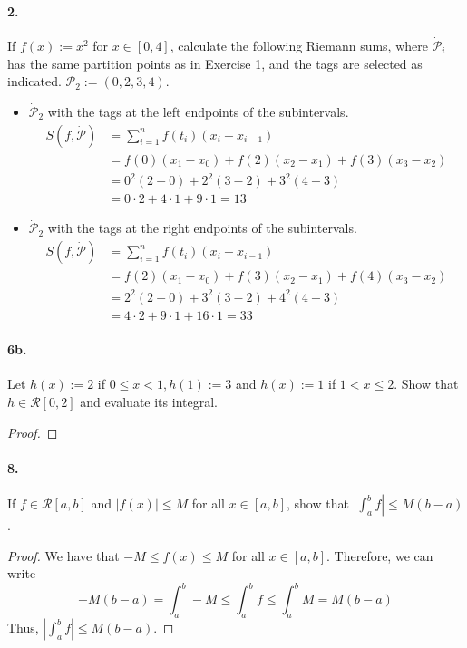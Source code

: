 \documentclass[12pt]{article}
\theoremstyle{remark}
\begin{document}
\paragraph{2.} If $f(x):=x^2$ for $x \in[0,4]$, calculate the following Riemann sums, where $\dot{\mathcal{P}}_i$ has the same partition points as in Exercise 1, and the tags are selected as indicated. $\mathcal{P}_2 := (0, 2, 3, 4)$.
\begin{itemize}
    \item $\dot{\mathcal{P}}_2$ with the tags at the left endpoints of the subintervals.
    \begin{align*} 
        S(f, \dot{\mathcal{P}}) &=\sum_{i=1}^n f\left(t_i\right)\left(x_i-x_{i-1}\right) \\
        &=f(0)\left(x_1-x_0\right)+f(2)\left(x_2-x_1\right)+f(3)\left(x_3-x_2\right) \\
        &=0^2(2-0)+2^2(3-2)+3^2(4-3) \\
        &=0 \cdot 2+4 \cdot 1+9 \cdot 1=13 
    \end{align*}
    \item $\dot{\mathcal{P}}_2$ with the tags at the right endpoints of the subintervals.
    \begin{align*}
        S(f, \dot{\mathcal{P}}) &=\sum_{i=1}^n f\left(t_i\right)\left(x_i-x_{i-1}\right) \\
        &=f(2)\left(x_1-x_0\right)+f(3)\left(x_2-x_1\right)+f(4)\left(x_3-x_2\right) \\
        &=2^2(2-0)+3^2(3-2)+4^2(4-3) \\
        &=4 \cdot 2+9 \cdot 1+16 \cdot 1=33
    \end{align*}
\end{itemize}

\paragraph{6b.} Let $h(x):=2$ if $0 \leq x<1, h(1):=3$ and $h(x):=1$ if $1<x \leq 2$. Show that $h \in \mathcal{R}[0,2]$ and evaluate its integral.
\begin{proof}

\end{proof}

\paragraph{8.} If $f \in \mathcal{R}[a, b]$ and $|f(x)| \leq M$ for all $x \in[a, b]$, show that $\left|\int_a^b f\right| \leq M(b-a)$.
\begin{proof}
    We have that $-M \leq f(x) \leq M$ for all $x \in[a, b]$. Therefore, we can write $$-M(b - a) = \int_a^b -M \leq \int_a^b f \leq \int_a^b M = M(b - a)$$ Thus, $\left|\int_a^b f\right| \leq M(b - a)$.
\end{proof}
\end{document}
